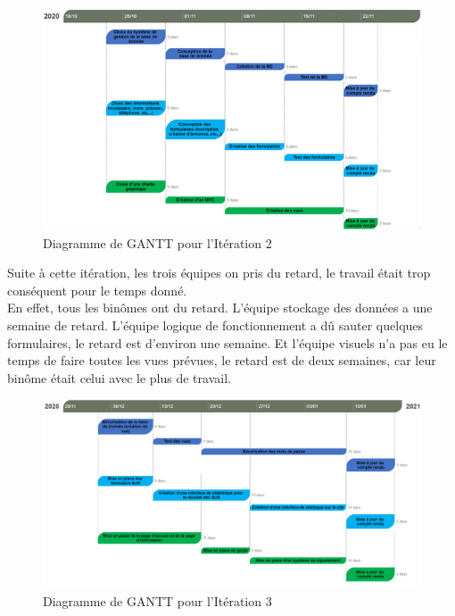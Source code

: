 \documentclass[a4paper,11pt]{article}
\begin{document}
\begin{figure}[H]
  \includegraphics[width=\linewidth]{images/gantt-iteration2.png}
  \caption{Diagramme de GANTT pour l'Itération 2}
  \label{fig:gantt-iteration2}
\end{figure}

Suite à cette itération, les trois équipes on pris du retard, le travail était trop conséquent pour le temps donné.\\
En effet, tous les binômes ont du retard. L'équipe stockage des données a une semaine de retard.
L'équipe logique de fonctionnement a dû sauter quelques formulaires, le retard est d'environ une semaine.
Et l'équipe visuels n'a pas eu le temps de faire toutes les vues prévues, le retard est de deux semaines, car leur binôme était celui avec le plus de travail.

\begin{figure}[H]
  \includegraphics[width=\linewidth]{images/gantt-iteration3.png}
  \caption{Diagramme de GANTT pour l'Itération 3}
  \label{fig:gantt-iteration3}
\end{figure}

\newpage
\end{document}
